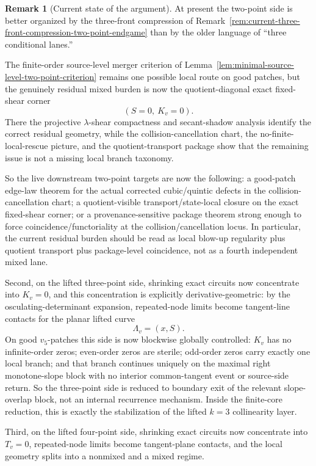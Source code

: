 \documentclass[11pt,a4paper]{amsart}
\theoremstyle{plain}
\theoremstyle{definition}
\newtheorem{remark}[theorem]{Remark}
\begin{document}
\begin{remark}[Current state of the argument]
At present the two-point side is better organized by the three-front
compression of
Remark~\ref{rem:current-three-front-compression-two-point-endgame}
than by the older language of ``three conditional lanes.''

The finite-order source-level merger criterion of
Lemma~\ref{lem:minimal-source-level-two-point-criterion}
remains one possible local route on good patches, but the genuinely residual
mixed burden is now the quotient-diagonal exact fixed-shear corner
\[
(S=0,\ K_v=0).
\]
There the projective $\lambda$-shear compactness and secant-shadow analysis
identify the correct residual geometry, while the collision-cancellation chart,
the no-finite-local-rescue picture, and the quotient-transport package show
that the remaining issue is not a missing local branch taxonomy.

So the live downstream two-point targets are now the following: a good-patch
edge-law theorem for the actual corrected cubic/quintic defects in the
collision-cancellation chart; a quotient-visible transport/state-local closure
on the exact fixed-shear corner; or a provenance-sensitive package theorem
strong enough to force coincidence/functoriality at the
collision/cancellation locus. In particular, the current residual burden should
be read as local blow-up regularity plus quotient transport plus package-level
coincidence, not as a fourth independent mixed lane.

Second, on the lifted three-point side, shrinking exact circuits now
concentrate into $K_v=0$, and this concentration is explicitly
derivative-geometric: by the osculating-determinant expansion, repeated-node
limits become tangent-line contacts for the planar lifted curve
\[
\Lambda_v=(x,S).
\]
On good $v_5$-patches this side is now blockwise globally controlled:
$K_v$ has no infinite-order zeros; even-order zeros are sterile; odd-order
zeros carry exactly one local branch; and that branch continues uniquely on
the maximal right monotone-slope block with no interior common-tangent event
or source-side return. So the three-point side is reduced to boundary exit of
the relevant slope-overlap block, not an internal recurrence mechanism.
Inside the finite-core reduction, this is exactly the stabilization of the
lifted $k=3$ collinearity layer.

Third, on the lifted four-point side, shrinking exact circuits now
concentrate into $T_v=0$, repeated-node limits become tangent-plane
contacts, and the local geometry splits into a nonmixed and a mixed regime.


\end{remark}
\end{document}
